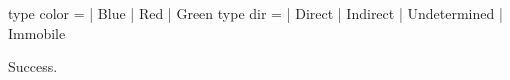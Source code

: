 \runverbatimtrue
{}
\begin{RunVerbatimMsg}
type color   =  | Blue  | Red  | Green
type dir   =  | Direct  | Indirect  | Undetermined  | Immobile
\end{RunVerbatimMsg}
\begin{RunVerbatimErr}
Success.
\end{RunVerbatimErr}
